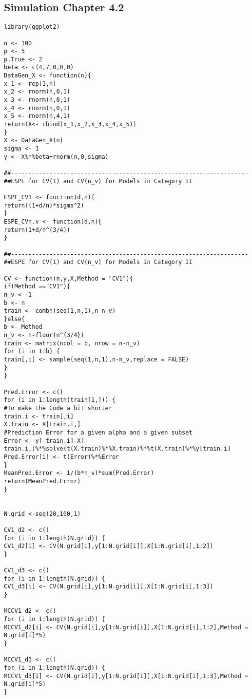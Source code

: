 \documentclass[Research_Module_ES.tex]{subfiles}
\begin{document}
\subsection*{Simulation Chapter 4.2}
\begin{lstlisting}[title={Simulation Graphic Ilustration ESPE CV1 and CV($n_\nu$)}]
library(ggplot2)

n <- 100
p <- 5
p.True <- 2
beta <- c(4,7,0,0,0)
DataGen_X <- function(n){
x_1 <- rep(1,n)         
x_2 <- rnorm(n,0,1)
x_3 <- rnorm(n,0,1)
x_4 <- rnorm(n,0,1)
x_5 <- rnorm(n,4,1)
return(X<- cbind(x_1,x_2,x_3,x_4,x_5))
}
X <- DataGen_X(n)
sigma <- 1
y <- X%*%beta+rnorm(n,0,sigma)

##--------------------------------------------------------------------
##ESPE for CV(1) and CV(n_v) for Models in Category II

ESPE_CV1 <- function(d,n){
return((1+d/n)*sigma^2)
}
ESPE_CVn.v <- function(d,n){
return(1+d/n^(3/4))
}

##--------------------------------------------------------------------
##ESPE for CV(1) and CV(n_v) for Models in Category II

CV <- function(n,y,X,Method = "CV1"){
if(Method =="CV1"){
n_v <- 1
b <- n
train <- combn(seq(1,n,1),n-n_v)
}else{
b <- Method
n_v <- n-floor(n^{3/4})
train <- matrix(ncol = b, nrow = n-n_v)
for (i in 1:b) {
train[,i] <- sample(seq(1,n,1),n-n_v,replace = FALSE)
}
}

Pred.Error <- c()
for (i in 1:length(train[1,])) {
#To make the Code a bit shorter
train.i <- train[,i]                 
X.train <- X[train.i,]    
#Prediction Error for a given alpha and a given subset
Error <- y[-train.i]-X[-train.i,]%*%solve(t(X.train)%*%X.train)%*%t(X.train)%*%y[train.i]
Pred.Error[i] <- t(Error)%*%Error
}
MeanPred.Error <- 1/(b*n_v)*sum(Pred.Error)
return(MeanPred.Error)
}


N.grid <-seq(20,100,1)

CV1_d2 <- c()
for (i in 1:length(N.grid)) {
CV1_d2[i] <- CV(N.grid[i],y[1:N.grid[i]],X[1:N.grid[i],1:2])
}

CV1_d3 <- c()
for (i in 1:length(N.grid)) {
CV1_d3[i] <- CV(N.grid[i],y[1:N.grid[i]],X[1:N.grid[i],1:3])
}

MCCV1_d2 <- c()
for (i in 1:length(N.grid)) {
MCCV1_d2[i] <- CV(N.grid[i],y[1:N.grid[i]],X[1:N.grid[i],1:2],Method = N.grid[i]*5)
}

MCCV1_d3 <- c()
for (i in 1:length(N.grid)) {
MCCV1_d3[i] <- CV(N.grid[i],y[1:N.grid[i]],X[1:N.grid[i],1:3],Method = N.grid[i]*5)
}


\end{lstlisting}
\end{document}
